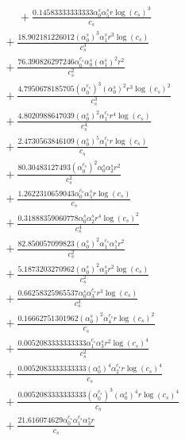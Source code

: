 \documentclass[10pt]{article}
\begin{document}
\begin{align*}
\phantom{R_{3,8}} &\phantom{={}}{}  + \frac{0.14583333333333 \alpha_{0}^s \alpha_{5}^s r \log{\left(c_{s} \right)}^{3}}{c_{s}} \\
&{}  + \frac{18.902181226012 \left(\alpha_{0}^s\right)^{3} \alpha_{1}^s r^{3} \log{\left(c_{s} \right)}}{c_{s}^{3}} \\
&{}  + \frac{76.390826297246 \alpha_{0}^{c_s} \alpha_{0}^s \left(\alpha_{1}^s\right)^{2} r^{2}}{c_{s}^{2}} \\
&{}  + \frac{4.7950678185705 \left(\alpha_{0}^{c_s}\right)^{3} \left(\alpha_{0}^s\right)^{2} r^{3} \log{\left(c_{s} \right)}^{2}}{c_{s}^{3}} \\
&{}  + \frac{4.8020988647039 \left(\alpha_{0}^s\right)^{2} \alpha_{1}^{c_s} r^{4} \log{\left(c_{s} \right)}}{c_{s}^{4}} \\
&{}  + \frac{2.4730563846109 \left(\alpha_{0}^s\right)^{5} \alpha_{1}^{c_s} r \log{\left(c_{s} \right)}}{c_{s}} \\
&{}  + \frac{80.30483127493 \left(\alpha_{0}^{c_s}\right)^{2} \alpha_{0}^s \alpha_{2}^s r^{2}}{c_{s}^{2}} \\
&{}  + \frac{1.2622310659043 \alpha_{0}^{c_s} \alpha_{5}^s r \log{\left(c_{s} \right)}}{c_{s}} \\
&{}  + \frac{0.31888359060778 \alpha_{0}^s \alpha_{2}^s r^{4} \log{\left(c_{s} \right)}^{2}}{c_{s}^{4}} \\
&{}  + \frac{82.850057099823 \left(\alpha_{0}^s\right)^{2} \alpha_{1}^{c_s} \alpha_{1}^s r^{2}}{c_{s}^{2}} \\
&{}  + \frac{5.1873203270962 \left(\alpha_{0}^s\right)^{2} \alpha_{3}^s r^{2} \log{\left(c_{s} \right)}}{c_{s}^{2}} \\
&{}  + \frac{0.66258325965537 \alpha_{0}^s \alpha_{3}^{c_s} r^{3} \log{\left(c_{s} \right)}}{c_{s}^{3}} \\
&{}  + \frac{0.16662751301962 \left(\alpha_{0}^s\right)^{2} \alpha_{4}^{c_s} r \log{\left(c_{s} \right)}^{2}}{c_{s}} \\
&{}  + \frac{0.0052083333333333 \alpha_{1}^{c_s} \alpha_{3}^s r^{2} \log{\left(c_{s} \right)}^{4}}{c_{s}^{2}} \\
&{}  + \frac{0.0052083333333333 \left(\alpha_{0}^s\right)^{4} \alpha_{2}^{c_s} r \log{\left(c_{s} \right)}^{4}}{c_{s}} \\
&{}  + \frac{0.0052083333333333 \left(\alpha_{0}^{c_s}\right)^{3} \left(\alpha_{0}^s\right)^{4} r \log{\left(c_{s} \right)}^{4}}{c_{s}} \\
&{}  + \frac{21.616074629 \alpha_{0}^{c_s} \alpha_{1}^{c_s} \alpha_{3}^s r}{c_{s}} \\

\end{align*}
\end{document}
